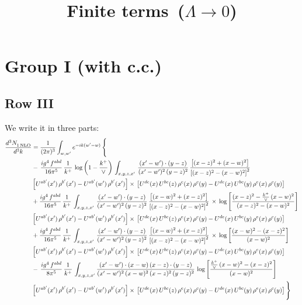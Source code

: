 \documentclass[9pt]{article}
\title{Finite terms\, ($\Lambda\to 0$)}
\author{}
\date{}
\numberwithin{equation}{section}
\begin{document}
\maketitle
\section{Group I (with c.c.)}
\subsection{Row III}
We write it in three parts:
\begin{align}
   \frac{d^{3}N_{1\,\rm NLO}^{\rm}}{d^{3}k}  & =  \frac{1}{(2\pi)^{3}}  \int_{w, w^\prime} e^{-ik(w^\prime-w)}\, \Bigg\{\notag \\
& -\,\frac{ig^{4}\,f^{abd}}{16\pi^{5}}\,\frac{1}{k^{+}}\,\log{\left(1-\frac{k^{+}}{\vee}\right)}\,\int_{x,y,z,x'}\, \frac{(x'-w')\cdot (y-z)}{(x'-w')^{2}\,(y-z)^{2}}\,\frac{\left[(x-z)^{2}+(x-w)^{2}\right]}{\left[(x-z)^{2}-(x-w)^{2}\right]^{2}}\notag \\ & \left[U^{ab'}(x')\,\rho^{b'}(x')-U^{ab'}(w')\, \rho^{b'}(x')\right]\times\, \left[U^{de}(x)\,U^{bc}(z)\, \rho^{e}(x)\,\rho^{c}(y)-U^{de}(x)\,U^{bc}(y)\,\rho^{e}(x)\,\rho^{c}(y)\right] \notag \\
&  +\frac{ig^{4}\,f^{abd}}{16\pi^{5}}\, \frac{1}{k^{+}}\,\int_{x,y,z,x'}\, \frac{(x'-w')\cdot (y-z)}{(x'-w')^{2}\,(y-z)^{2}}\, \frac{\left[(x-w)^{2}+(x-z)^{2}\right]}{\left[(x-z)^{2}-(x-w)^{2}\right]^{2}}\, \times\, \log{\left[\frac{(x-z)^{2}-\frac{k^{+}}{\vee}\,(x-w)^{2}}{(x-z)^{2}-(x-w)^{2}}\right]}\notag \\ & \left[U^{ab'}(x')\,\rho^{b'}(x')-U^{ab'}(w')\, \rho^{b'}(x')\right]\times\, \left[U^{de}(x)\,U^{bc}(z)\, \rho^{e}(x)\,\rho^{c}(y)-U^{de}(x)\,U^{bc}(y)\,\rho^{e}(x)\,\rho^{c}(y)\right] \notag \\
&  +\frac{ig^{4}\,f^{abd}}{16\pi^{5}}\, \frac{1}{k^{+}}\,\int_{x,y,z,x'}\, \frac{(x'-w')\cdot (y-z)}{(x'-w')^{2}\,(y-z)^{2}}\, \frac{\left[(x-w)^{2}+(x-z)^{2}\right]}{\left[(x-z)^{2}-(x-w)^{2}\right]^{2}}\, \times\, \log{\left[\frac{(x-w)^{2}-(x-z)^{2}}{(x-w)^{2}}\right]}\notag \\ & \left[U^{ab'}(x')\,\rho^{b'}(x')-U^{ab'}(w')\, \rho^{b'}(x')\right]\times\, \left[U^{de}(x)\,U^{bc}(z)\, \rho^{e}(x)\,\rho^{c}(y)-U^{de}(x)\,U^{bc}(y)\,\rho^{e}(x)\,\rho^{c}(y)\right] \notag \\
&-\, \frac{ig^{4}\,f^{abd}}{8\pi^{5}}\,\frac{1}{k^{+}}\,\int_{x,y,z,x'}\frac{(x'-w')\cdot (x-w)\, (x-z)\cdot (y-z)}{(x'-w')^{2}\, (x-w)^{2}\, (x-z)^{2}\, (y-z)^{2}}\,\log{\left[\frac{\frac{k^{+}}{\vee}\,(x-w)^{2}-(x-z)^{2}}{(x-w)^{2}}\right]} \notag \\ & \left[U^{ab'}(x')\,\rho^{b'}(x')-U^{ab'}(w')\, \rho^{b'}(x')\right]\times\, \left[U^{de}(x)\,U^{bc}(z)\, \rho^{e}(x)\,\rho^{c}(y)-U^{de}(x)\,U^{bc}(y)\,\rho^{e}(x)\,\rho^{c}(y)\right]\Bigg\}
\end{align}
\end{document}

